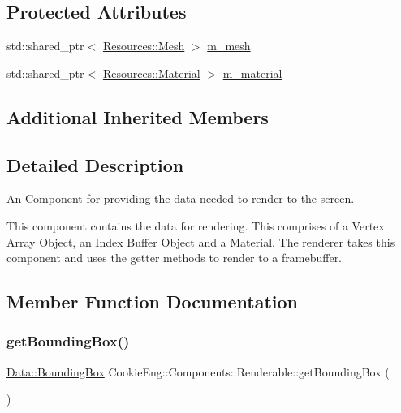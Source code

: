 \subsection*{Protected Attributes}
\begin{DoxyCompactItemize}
\item 
std\+::shared\+\_\+ptr$<$ \hyperlink{struct_cookie_eng_1_1_resources_1_1_mesh}{Resources\+::\+Mesh} $>$ \hyperlink{class_cookie_eng_1_1_components_1_1_renderable_a9da5e010c1d6c0ccb008b2af664b925a}{m\+\_\+mesh}
\item 
std\+::shared\+\_\+ptr$<$ \hyperlink{class_cookie_eng_1_1_resources_1_1_material}{Resources\+::\+Material} $>$ \hyperlink{class_cookie_eng_1_1_components_1_1_renderable_a69e36f6c8b8d58c978d86f2591c53ec5}{m\+\_\+material}
\end{DoxyCompactItemize}
\subsection*{Additional Inherited Members}


\subsection{Detailed Description}
An Component for providing the data needed to render to the screen. 

This component contains the data for rendering. This comprises of a Vertex Array Object, an Index Buffer Object and a Material. The renderer takes this component and uses the getter methods to render to a framebuffer. 

\subsection{Member Function Documentation}
\mbox{\label{class_cookie_eng_1_1_components_1_1_renderable_a4563f6482300ce4fa250188409a787f6}} 
\subsubsection{\texorpdfstring{get\+Bounding\+Box()}{getBoundingBox()}}
{\footnotesize\ttfamily \hyperlink{class_cookie_eng_1_1_data_1_1_bounding_box}{Data\+::\+Bounding\+Box} Cookie\+Eng\+::\+Components\+::\+Renderable\+::get\+Bounding\+Box (\begin{DoxyParamCaption}{ }\end{DoxyParamCaption})}



